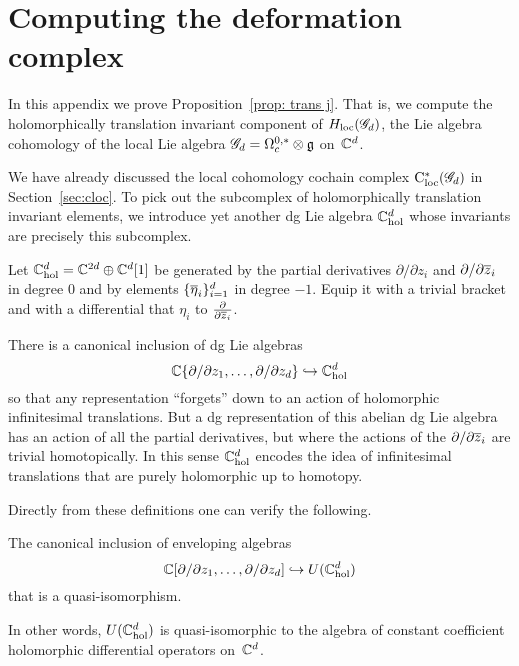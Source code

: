 \appendix

\section{Computing the deformation complex}\label{sec: hol trans}

In this appendix we prove Proposition~\ref{prop: trans j}. 
That is, we compute the holomorphically translation invariant component of $H_{\rm loc}(\sG_d)$, 
the Lie algebra cohomology of the local Lie algebra $\sG_d = \Omega^{0,*}_c \tensor \fg$ on~$\CC^d$. 

We have already discussed the local cohomology cochain complex $\cloc^*(\sG_d)$ in Section~\ref{sec:cloc}.
To pick out the subcomplex of holomorphically translation invariant elements,
we introduce yet another dg Lie algebra $\CC^{d}_{\rm hol}$ whose invariants are precisely this subcomplex.

\begin{dfn}
Let $\CC^{d}_{\rm hol} = \CC^{2d} \oplus \CC^d[1]$ be generated by the partial derivatives $\partial/\partial z_i$ and $\partial/\partial \zbar_i$ in degree 0 and by elements $\{\Bar{\eta}_i\}_{i=1}^d$ in degree $-1$.
Equip it with a trivial bracket and with a differential that $\eta_i$ to $\frac{\partial}{\partial \zbar_i}$.
\end{dfn}

There is a canonical inclusion of dg Lie algebras
\[
\CC\{\partial / \partial z_1, \ldots, \partial / \partial z_d\} \hookrightarrow \CC^{d}_{\rm hol}
\]
so that any representation ``forgets'' down to an action of holomorphic infinitesimal translations.
But a dg representation of this abelian dg Lie algebra has an action of all the partial derivatives,
but where the actions of the $\partial/\partial \zbar_i$ are trivial homotopically.
In this sense $\CC^{d}_{\rm hol}$ encodes the idea of infinitesimal translations that are purely holomorphic up to homotopy.

Directly from these definitions one can verify the following.

\begin{lem}
The canonical inclusion of enveloping algebras
\[
\CC[\partial / \partial z_1, \ldots, \partial / \partial z_d] \hookrightarrow U(\CC^{d}_{\rm hol})
\]
that is a quasi-isomorphism.
\end{lem}

In other words, $U(\CC^{d}_{\rm hol})$ is quasi-isomorphic to the algebra of constant coefficient holomorphic differential operators on~$\CC^d$. 

